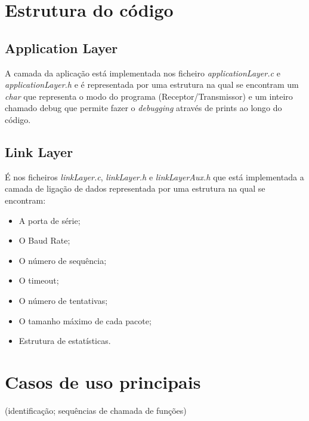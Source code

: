 \documentclass[11pt]{article}
\begin{document}
\newpage
\section{Estrutura do código}

\subsection{Application Layer}
 
  A camada da aplicação está implementada nos ficheiro \textit{applicationLayer.c} e \textit{applicationLayer.h} e é representada por uma estrutura na qual se encontram um \textit{char} que representa o modo do programa (Receptor/Transmissor) e um inteiro chamado debug que permite fazer o \textit{debugging} através de prints ao longo do código.
 
\small

\normalsize

\subsection{Link Layer}
 
 É nos ficheiros \textit{linkLayer.c}, \textit{linkLayer.h} e \textit{linkLayerAux.h} que está implementada a camada de ligação de dados representada por uma estrutura na qual se encontram:

\begin{itemize}
  \item A porta de série;
   \item O Baud Rate;
   \item O número de sequência;
   \item O timeout;
   \item O número de tentativas;
   \item O tamanho máximo de cada pacote;
   \item Estrutura de estatísticas.
\end{itemize}

\small

\normalsize

\newpage
\section{Casos de uso principais}

 (identificação; sequências de chamada de funções)

\end{document}
